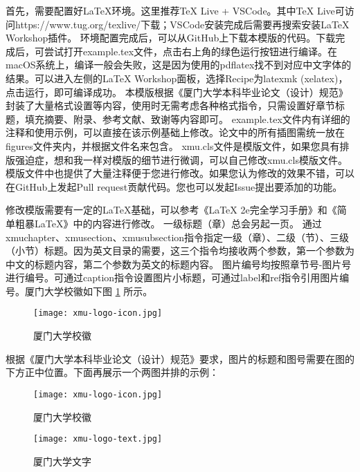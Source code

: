 \documentclass{xmu}
\begin{document}
首先，需要配置好LaTeX环境。这里推荐TeX Live + VSCode。其中TeX Live可访问{https://www.tug.org/texlive/}下载；VSCode安装完成后需要再搜索安装LaTeX Workshop插件。
环境配置完成后，可以从GitHub上下载本模版的代码\cite{template}。下载完成后，可尝试打开example.tex文件，点击右上角的绿色运行按钮进行编译。在macOS系统上，编译一般会失败，这是因为使用的pdflatex找不到对应中文字体的结果。可以进入左侧的LaTeX Workshop面板，选择Recipe为latexmk (xelatex)，点击运行，即可编译成功。
本模版根据《厦门大学本科毕业论文（设计）规范》\cite{xmuthesis}封装了大量格式设置等内容，使用时无需考虑各种格式指令，只需设置好章节标题，填充摘要、附录、参考文献、致谢等内容即可。
example.tex文件内有详细的注释和使用示例，可以直接在该示例基础上修改。论文中的所有插图需统一放在figures文件夹内，并根据文件名来包含。
xmu.cls文件是模版文件，如果您具有排版强迫症，想和我一样对模版的细节进行微调，可以自己修改xmu.cls模版文件。模版文件中也提供了大量注释便于您进行修改。如果您认为修改的效果不错，可以在GitHub上\cite{template}发起Pull request贡献代码。您也可以发起Issue提出要添加的功能。
\par
修改模版需要有一定的LaTeX基础，可以参考《LaTeX 2e完全学习手册》\cite{latex2e}和《简单粗暴LaTeX》\cite{easylatex}中的内容进行修改。
一级标题（章）总会另起一页。
通过xmuchapter、xmusection、xmusubsection指令指定一级（章）、二级（节）、三级（小节）标题。因为英文目录的需要，这三个指令均接收两个参数，第一个参数为中文的标题内容，第二个参数为英文的标题内容。
图片编号均按照章节号-图片号进行编号。可通过caption指令设置图片小标题，可通过label和ref指令引用图片编号。厦门大学校徽如下图 \ref{xmulogo} 所示。
\begin{figure}[!htb]
    \centering
    \vspace{1em}
    \texttt{[image: xmu-logo-icon.jpg]}\\
    \caption{厦门大学校徽}\label{xmulogo}
\end{figure}
根据《厦门大学本科毕业论文（设计）规范》\cite{xmuthesis}要求，图片的标题和图号需要在图的下方正中位置。下面再展示一个两图并排的示例：
\begin{figure}[!htb]
    \vspace{1em}
    \begin{minipage}{0.5\linewidth}
        \centering
        \texttt{[image: xmu-logo-icon.jpg]}
        \caption{厦门大学校徽}\label{xmu1}
    \end{minipage}
    \begin{minipage}{0.5\linewidth}
        \centering
        \texttt{[image: xmu-logo-text.jpg]}
        \caption{厦门大学文字}\label{xmu2}
    \end{minipage}
\end{figure}
\end{document}
